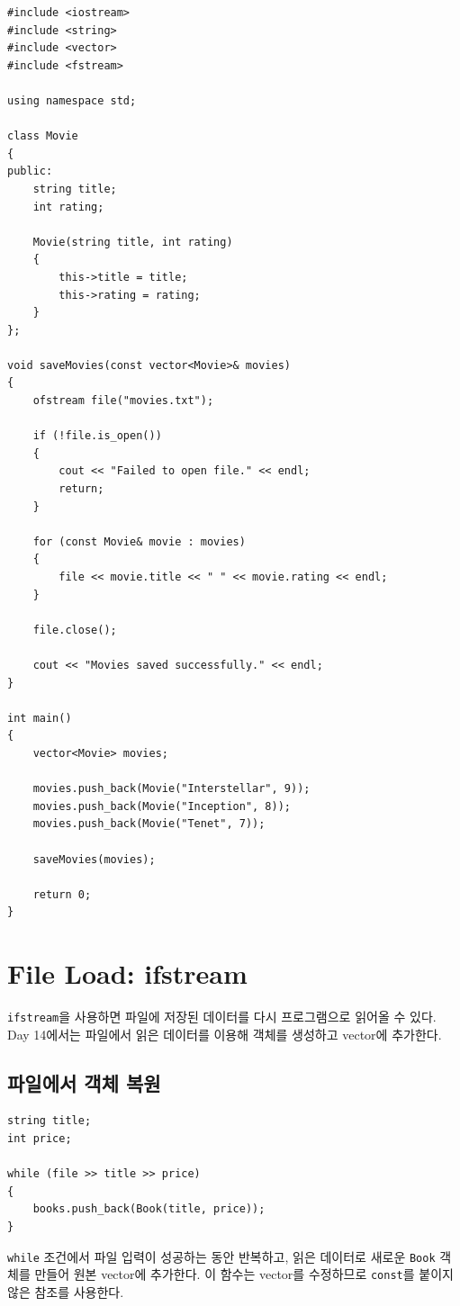 \documentclass[11pt,a4paper]{article}
\begin{document}
\begin{lstlisting}
#include <iostream>
#include <string>
#include <vector>
#include <fstream>

using namespace std;

class Movie
{
public:
    string title;
    int rating;

    Movie(string title, int rating)
    {
        this->title = title;
        this->rating = rating;
    }
};

void saveMovies(const vector<Movie>& movies)
{
    ofstream file("movies.txt");

    if (!file.is_open())
    {
        cout << "Failed to open file." << endl;
        return;
    }

    for (const Movie& movie : movies)
    {
        file << movie.title << " " << movie.rating << endl;
    }

    file.close();

    cout << "Movies saved successfully." << endl;
}

int main()
{
    vector<Movie> movies;

    movies.push_back(Movie("Interstellar", 9));
    movies.push_back(Movie("Inception", 8));
    movies.push_back(Movie("Tenet", 7));

    saveMovies(movies);

    return 0;
}
\end{lstlisting}

\section{File Load: ifstream}
\texttt{ifstream}을 사용하면 파일에 저장된 데이터를 다시 프로그램으로 읽어올 수 있다.
Day 14에서는 파일에서 읽은 데이터를 이용해 객체를 생성하고 vector에 추가한다.

\subsection{파일에서 객체 복원}
\begin{lstlisting}
string title;
int price;

while (file >> title >> price)
{
    books.push_back(Book(title, price));
}
\end{lstlisting}

\texttt{while} 조건에서 파일 입력이 성공하는 동안 반복하고,
읽은 데이터로 새로운 \texttt{Book} 객체를 만들어 원본 vector에 추가한다.
이 함수는 vector를 수정하므로 \texttt{const}를 붙이지 않은 참조를 사용한다.
\end{document}
